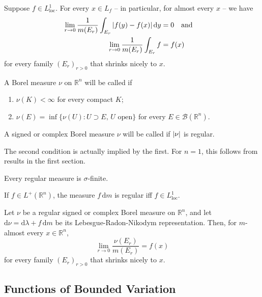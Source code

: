 \documentclass[12pt]{article}	%
\newcommand{\loc}{L^{1}_{\operatorname{loc}}}
\begin{document}
\begin{thm}
	Suppose $f \in \loc$. For every $x \in L_{f}$ -- in particular, for almost every $x$ -- we have
	\begin{align*} 
		\lim_{r \to 0} \frac{1}{m(E_{r})} \int_{E_{r}} {\left\lvert f(y) - f(x) \right\lvert} \,{\mathrm{d}}y &= 0 \quad\text{and}\quad \\
		\lim_{r \to 0} \frac{1}{m(E_{r})} \int_{E_{r}} f &= f(x)
	\end{align*}
	for every family $(E_{r})_{r > 0}$ that shrinks nicely to $x$.
\end{thm}

\begin{defn}
	A Borel measure $\nu$ on $\mathbb{R}^{n}$ will be called  if
	\begin{enumerate}
		\item $\nu(K) < \infty$ for every compact $K$;
		\item $\nu(E) = \inf\{\nu(U) : U \supset E,\, U \text{ open}\}$ for every $E \in \mathcal{B}(\mathbb{R}^{n})$.
	\end{enumerate}
	A signed or complex Borel measure $\nu$ will be called  if ${\left\lvert \nu \right\lvert}$ is regular.
\end{defn}
The second condition is actually implied by the first. For $n = 1$, this follows from results in the first section.

Every regular measure is $\sigma$-finite. 

\begin{ex}
	If $f \in L^{+}(\mathbb{R}^{n})$, the measure $f \,{\mathrm d}m$ is regular iff $f \in \loc$.
\end{ex}

\begin{thm}
	Let $\nu$ be a regular signed or complex Borel measure on $\mathbb{R}^{n}$, and let ${\mathrm d}\nu = {\mathrm d}\lambda + f \, {\mathrm d}m$ be its Lebesgue-Radon-Nikodym representation. Then, for $m$-almost every $x \in \mathbb{R}^{n}$,
	\begin{equation*} 
		\lim_{r \to 0} \frac{\nu(E_{r})}{m(E_{r})} = f(x)
	\end{equation*}
	for every family $(E_{r})_{r > 0}$ that shrinks nicely to $x$.
\end{thm}

\subsection{Functions of Bounded Variation}
\end{document}

